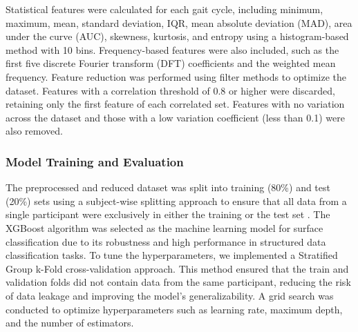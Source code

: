 \documentclass[sensors,article,submit,pdftex,moreauthors]{Definitions/mdpi}
\begin{document}


Statistical features were calculated for each gait cycle, including minimum, maximum, mean, standard deviation, IQR, mean absolute deviation (MAD), area under the curve (AUC), skewness, kurtosis, and entropy using a histogram-based method with 10 bins. Frequency-based features were also included, such as the first five discrete Fourier transform (DFT) coefficients and the weighted mean frequency.
Feature reduction was performed using filter methods to optimize the dataset. Features with a correlation threshold of 0.8 or higher were discarded, retaining only the first feature of each correlated set. Features with no variation across the dataset and those with a low variation coefficient (less than 0.1) were also removed.

\subsubsection{Model Training and Evaluation}

The preprocessed and reduced dataset was split into training (80\%) and test (20\%) sets using a subject-wise splitting approach to ensure that all data from a single participant were exclusively in either the training or the test set \cite{Saeb2017}. The XGBoost algorithm \cite{chen2016xgboost} was selected as the machine learning model for surface classification due to its robustness and high performance in structured data classification tasks. To tune the hyperparameters, we implemented a Stratified Group k-Fold cross-validation approach. This method ensured that the train and validation folds did not contain data from the same participant, reducing the risk of data leakage and improving the model's generalizability. A grid search was conducted to optimize hyperparameters such as learning rate, maximum depth, and the number of estimators.
\end{document}
